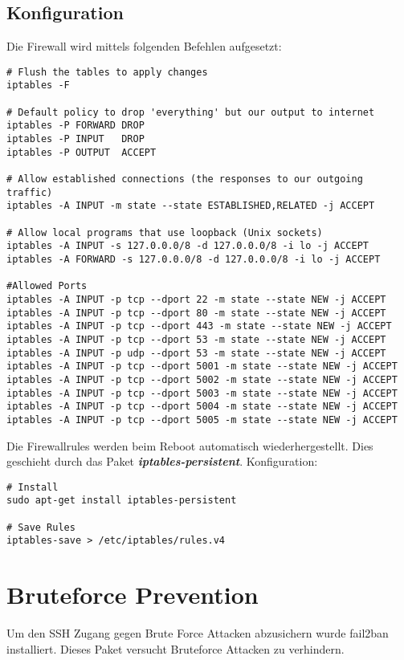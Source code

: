 \documentclass[12pt,a4paper,oneside,ngerman]{scrartcl}
\begin{document}
\subsection{Konfiguration}
Die Firewall wird mittels folgenden Befehlen aufgesetzt:
\begin{lstlisting}
# Flush the tables to apply changes
iptables -F

# Default policy to drop 'everything' but our output to internet
iptables -P FORWARD DROP
iptables -P INPUT   DROP
iptables -P OUTPUT  ACCEPT

# Allow established connections (the responses to our outgoing traffic)
iptables -A INPUT -m state --state ESTABLISHED,RELATED -j ACCEPT

# Allow local programs that use loopback (Unix sockets)
iptables -A INPUT -s 127.0.0.0/8 -d 127.0.0.0/8 -i lo -j ACCEPT
iptables -A FORWARD -s 127.0.0.0/8 -d 127.0.0.0/8 -i lo -j ACCEPT

#Allowed Ports
iptables -A INPUT -p tcp --dport 22 -m state --state NEW -j ACCEPT
iptables -A INPUT -p tcp --dport 80 -m state --state NEW -j ACCEPT
iptables -A INPUT -p tcp --dport 443 -m state --state NEW -j ACCEPT
iptables -A INPUT -p tcp --dport 53 -m state --state NEW -j ACCEPT
iptables -A INPUT -p udp --dport 53 -m state --state NEW -j ACCEPT
iptables -A INPUT -p tcp --dport 5001 -m state --state NEW -j ACCEPT
iptables -A INPUT -p tcp --dport 5002 -m state --state NEW -j ACCEPT
iptables -A INPUT -p tcp --dport 5003 -m state --state NEW -j ACCEPT
iptables -A INPUT -p tcp --dport 5004 -m state --state NEW -j ACCEPT
iptables -A INPUT -p tcp --dport 5005 -m state --state NEW -j ACCEPT
\end{lstlisting}


Die Firewallrules werden beim Reboot automatisch wiederhergestellt. Dies geschieht durch das Paket \textbf{\textit{iptables-persistent}}. Konfiguration\cite{HOWTO:2}:

\begin{lstlisting}
# Install
sudo apt-get install iptables-persistent

# Save Rules
iptables-save > /etc/iptables/rules.v4
\end{lstlisting}

\section{Bruteforce Prevention}
Um den SSH Zugang gegen Brute Force Attacken abzusichern wurde fail2ban installiert. Dieses Paket versucht Bruteforce Attacken zu verhindern. \cite{HOWTO:1} \\
\end{document}
